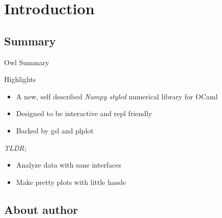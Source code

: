 \documentclass{beamer}
\begin{document}
\section{Introduction}

\subsection{Summary}

\begin{frame}{Owl Summary}
\begin{block} {Highlights}
 \begin{itemize}
  \item A new, self described \textit{Numpy styled} numerical library for OCaml \newline
  \item Designed to be interactive and repl friendly\newline
  \item Backed by gsl and plplot\newline
\end{itemize}
\end{block}
\pause
\begin{block}{\emph{TLDR;}}
\begin{itemize}
  \item Analyze data with sane interfaces 
  \item Make pretty plots with little hassle
 \end{itemize}
\end{block}
\end{frame}


\subsection{About author}
\end{document}
